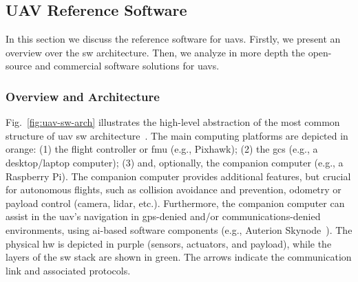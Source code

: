 \subsection{UAV Reference Software}%
\label{sec:uav-ref-sw}
In this section we discuss the reference software for \glspl{uav}.
Firstly, we present an overview over the \gls{sw} architecture. Then, we analyze
in more depth the open-source and commercial software solutions for \glspl{uav}.

\subsubsection{Overview and Architecture}%
\label{sec:overv-arch-sw}
Fig.~\ref{fig:uav-sw-arch} illustrates the high-level abstraction of the
most common structure of \gls{uav} \gls{sw}
architecture~\cite{leccadito2018survey,px4-sysArch}.
%
The main computing platforms are depicted in orange: (1) the flight controller
or \gls{fmu} (e.g., Pixhawk); (2) the \gls{gcs} (e.g., a desktop/laptop computer);
(3) and, optionally, the companion computer (e.g., a Raspberry Pi).
The companion computer provides additional features, but crucial for autonomous
flights, such as collision avoidance and prevention, odometry or payload control
(camera, \gls{lidar}, etc.). Furthermore, the companion computer can assist in
the \gls{uav}'s navigation in \gls{gps}-denied and/or communications-denied
environments, using \gls{ai}-based software components (e.g., Auterion
Skynode~\cite{skynodeS-noJamming}).
%
The physical \gls{hw} is depicted in purple (sensors, actuators, and payload),
while the layers of the \gls{sw} stack are shown in green. The arrows indicate the communication link and
associated protocols.

